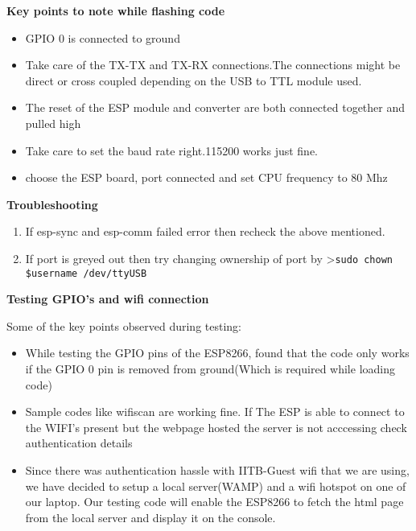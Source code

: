 \documentclass[16pt]{article}
\begin{document}
\textbf{Key points to note while flashing code}

\begin{itemize}

\item
  GPIO 0 is connected to ground
\item
  Take care of the TX-TX and TX-RX connections.The connections might be
  direct or cross coupled depending on the USB to TTL module used.
\item
  The reset of the ESP module and converter are both connected together
  and pulled high
\item
  Take care to set the baud rate right.115200 works just fine.
\item
  choose the ESP board, port connected and set CPU frequency to 80 Mhz
\end{itemize}

\vspace{0.5cm}
{\Large{\textbf{Troubleshooting}}}

\begin{enumerate}

\item
  If esp-sync and esp-comm failed error then recheck the above
  mentioned.
\item
  If port is greyed out then try changing ownership of port by
  \textgreater{}\texttt{sudo chown \$username /dev/ttyUSB}
\end{enumerate}

\vspace{0.5cm}
\textbf{Testing GPIO's and wifi connection}

Some of the key points observed during testing:

\begin{itemize}

\item
  While testing the GPIO pins of the ESP8266, found that the code only
  works if the GPIO 0 pin is removed from ground(Which is required while
  loading code)
\item
  Sample codes like wifiscan are working fine. If The ESP is able to
  connect to the WIFI's present but the webpage hosted the server is not
  acccessing check authentication details
\item
  Since there was authentication hassle with IITB-Guest wifi that we are
  using, we have decided to setup a local server(WAMP) and a wifi
  hotspot on one of our laptop. Our testing code will enable the ESP8266
  to fetch the html page from the local server and display it on the
  console.
  
\end{itemize}
\end{document}
